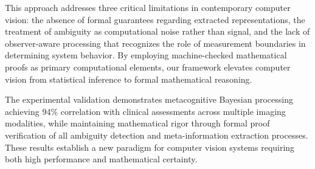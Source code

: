 \documentclass[11pt,a4paper]{article}
\begin{document}
This approach addresses three critical limitations in contemporary computer vision: the absence of formal guarantees regarding extracted representations, the treatment of ambiguity as computational noise rather than signal, and the lack of observer-aware processing that recognizes the role of measurement boundaries in determining system behavior. By employing machine-checked mathematical proofs as primary computational elements, our framework elevates computer vision from statistical inference to formal mathematical reasoning.

The experimental validation demonstrates metacognitive Bayesian processing achieving 94\% correlation with clinical assessments across multiple imaging modalities, while maintaining mathematical rigor through formal proof verification of all ambiguity detection and meta-information extraction processes. These results establish a new paradigm for computer vision systems requiring both high performance and mathematical certainty.
\end{document}
